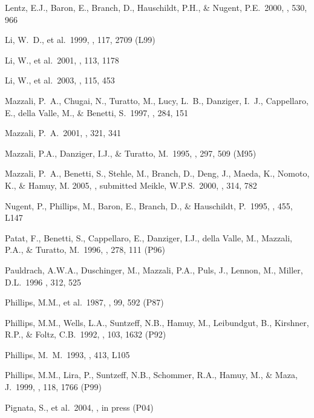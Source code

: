 \documentclass[preprint2]{aastex}
\begin{document}
\begin{thebibliography}{}
 Lentz, E.J., Baron, E., 
Branch, D., Hauschildt, P.H., \& Nugent, P.E.\ 2000, \apj, 530, 966 

 Li, W.~D., et al.\ 1999, 
\aj, 117, 2709 (L99)

 Li, W., et al.\ 2001, \pasp, 
113, 1178 

 Li, W., et al.\ 2003, \pasp, 
115, 453

 Mazzali, P.~A., Chugai, 
N., Turatto, M., Lucy, L.~B., Danziger, I.~J., Cappellaro, E., della Valle, 
M., \& Benetti, S.\ 1997, \mnras, 284, 151 

 Mazzali, P.~A.\ 2001, \mnras, 321, 341

 Mazzali, P.A., 
Danziger, I.J., \& Turatto, M.\ 1995, \aap, 297, 509 (M95)

 Mazzali, P.~A., Benetti, S., Stehle, M.,
Branch, D., Deng, J., Maeda, K., Nomoto, K., \& Hamuy, M. 2005, \mnras,
submitted
%
 Meikle, W.P.S.\ 2000, \mnras, 314, 782 

 Nugent, P., Phillips, 
M., Baron, E., Branch, D., \& Hauschildt, P.\ 1995, \apjl, 455, L147

 Patat, F., Benetti, S., 
Cappellaro, E., Danziger, I.J., della Valle, M., Mazzali, P.A., \& 
Turatto, M.\ 1996, \mnras, 278, 111 (P96)

 Pauldrach, A.W.A., Duschinger, M., 
Mazzali, P.A., Puls, J., Lennon, M., Miller, D.L.\ 1996 \aap, 312, 525 

 Phillips, M.M., et 
al.\ 1987, \pasp, 99, 592 (P87)

 Phillips, M.M., Wells, L.A., 
Suntzeff, N.B., Hamuy, M., Leibundgut, B., Kirshner, R.P., 
\& Foltz, C.B.\ 1992, \aj, 103, 1632 (P92)

 Phillips, M.~M.\ 1993, \apjl, 
413, L105 

 Phillips, M.M., Lira, 
P., Suntzeff, N.B., Schommer, R.A., Hamuy, M., \& Maza, J.\ 1999, \aj, 
118, 1766 (P99)

 Pignata, S., et al.\ 
2004, \mnras, in press (P04)


\end{thebibliography}
\end{document}
